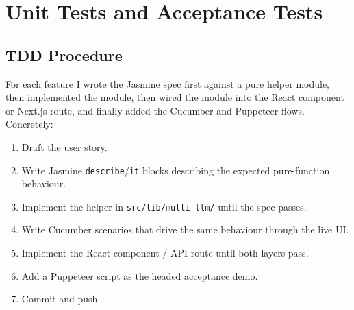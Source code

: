 \documentclass[11pt]{article}
\begin{document}
\begin{center}
\end{center}

\begin{center}
\end{center}

\section{Unit Tests and Acceptance Tests}

\subsection{TDD Procedure}

For each feature I wrote the Jasmine spec first against a pure helper
module, then implemented the module, then wired the module into the
React component or Next.js route, and finally added the Cucumber and
Puppeteer flows.  Concretely:

\begin{enumerate}[leftmargin=*]
  \item Draft the user story.
  \item Write Jasmine \texttt{describe}/\texttt{it} blocks describing
    the expected pure-function behaviour.
  \item Implement the helper in \texttt{src/lib/multi-llm/} until the
    spec passes.
  \item Write Cucumber scenarios that drive the same behaviour through
    the live UI.
  \item Implement the React component / API route until both layers
    pass.
  \item Add a Puppeteer script as the headed acceptance demo.
  \item Commit and push.
\end{enumerate}
\end{document}

